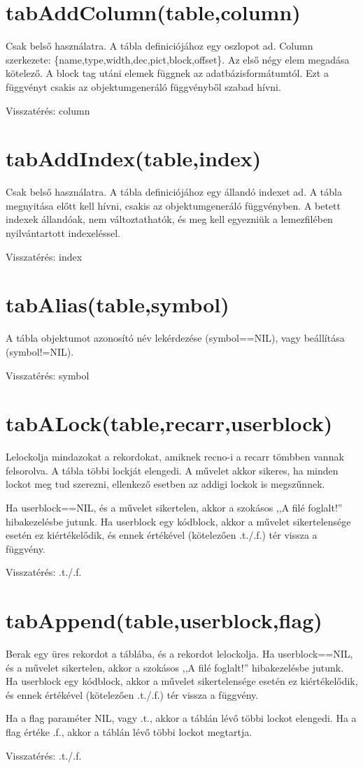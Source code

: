 
\newcommand{\function}[1]{\section{#1}}
 
\function{tabAddColumn(table,column)}
Csak belső használatra. A tábla definiciójához egy oszlopot ad.
Column szerkezete: \{name,type,width,dec,pict,block,offset\}.
Az első négy elem megadása kötelező. A block tag utáni elemek
függnek az adatbázisformátumtól. Ezt a függvényt csakis
az objektumgeneráló függvényből szabad hívni.

 
Visszatérés: column
 
\function{tabAddIndex(table,index)}
Csak belső használatra. A tábla definiciójához egy állandó indexet ad.
A tábla megnyitása előtt kell hívni, csakis az objektumgeneráló
függvényben. A betett indexek állandóak, nem változtathatók,
és meg kell egyezniük a lemezfilében nyilvántartott indexeléssel.
 
Visszatérés: index
 
\function{tabAlias(table,symbol) }
A tábla objektumot azonosító név lekérdezése (symbol==NIL), 
vagy beállítása (symbol!=NIL).

Visszatérés: symbol
 

\function{tabALock(table,recarr,userblock)}
Lelockolja mindazokat a rekordokat, amiknek recno-i
a recarr tömbben vannak felsorolva. A tábla többi
lockját elengedi. A művelet akkor sikeres, ha minden lockot
meg tud szerezni, ellenkező esetben az addigi lockok is megszűnnek.

Ha userblock==NIL, és a művelet sikertelen, 
akkor a szokásos ,,A filé foglalt!'' hibakezelésbe jutunk.
Ha userblock egy kódblock, akkor a művelet sikertelensége esetén
ez kiértékelődik, és ennek értékével (kötelezően .t./.f.) tér 
vissza a függvény. 
 
Visszatérés: .t./.f.
 
\function{tabAppend(table,userblock,flag)}
Berak egy üres rekordot a táblába, és a rekordot lelockolja.
Ha userblock==NIL, és a művelet sikertelen, 
akkor a szokásos ,,A filé foglalt!'' hibakezelésbe jutunk.
Ha userblock egy kódblock, akkor a művelet sikertelensége esetén
ez kiértékelődik, és ennek értékével (kötelezően .t./.f.) tér 
vissza a függvény. 

Ha a flag paraméter NIL, vagy .t., akkor a táblán lévő többi lockot elengedi.
Ha a flag értéke .f., akkor a táblán lévő többi lockot megtartja.

Visszatérés: .t./.f.


